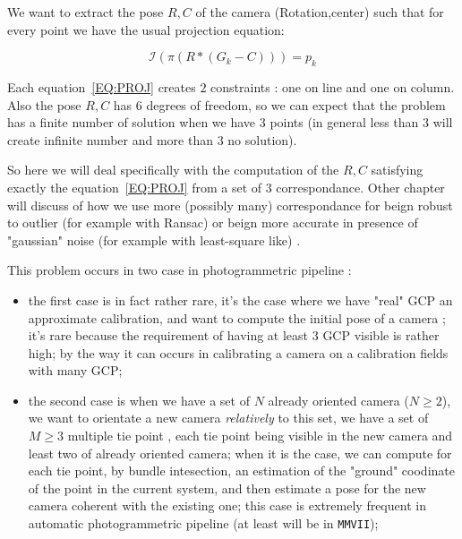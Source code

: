 We want to extract the pose $R,C$ of the camera (Rotation,center) such that for every point
we have the usual projection equation:

\begin{equation}
       \mathcal I(\pi (R*(G_k-C))) = p_k \label{EQ:PROJ}
\end{equation}


Each equation~\ref{EQ:PROJ}  creates $2$ constraints : one on line and one on column.
Also the pose $R,C$ has $6$ degrees of freedom, so we can expect that the problem has
a finite number of solution when we have $3$ points (in general less than $3$ will create
infinite number and more than $3$ no solution).

So here we will deal specifically  with the computation of the $R,C$ satisfying
exactly the equation~\ref{EQ:PROJ}  from a set of $3$ correspondance. Other
chapter will discuss of how we use more (possibly many) correspondance for beign 
robust to outlier (for
example with Ransac) or beign more accurate in presence of "gaussian" noise (for 
example with least-square like) .


This problem occurs in two case in photogrammetric pipeline :

\begin{itemize}
   \item the first case is in fact rather rare, it's the case where we have "real" GCP
         an approximate calibration, and want to compute the initial pose of a camera ;
         it's rare because the requirement of having at least $3$ GCP visible is rather
         high; by the way it can occurs in calibrating a camera on a calibration fields
         with many GCP;

 \item the second case is when we have a set of $N$ already oriented camera  ($N\geq 2 $),
       we want to orientate a new camera \emph{relatively} to this set, we have a
       set of $M \geq 3$ multiple tie point , each tie point being visible in the new
       camera and least two of already oriented camera;  when it is the case,
       we can compute for each tie point, by bundle intesection, an estimation of the
       "ground" coodinate of the point in the current system, and then estimate a pose
       for the new camera coherent with the existing one;
       this case is extremely frequent in automatic photogrammetric
       pipeline (at least will be in {\tt MMVII});

\end{itemize}


